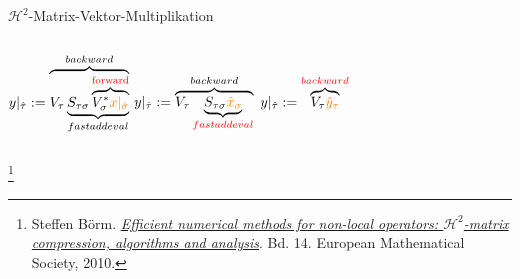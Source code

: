 \documentclass[10pt]{beamer}
\let\svthefootnote\thefootnote
\begin{document}
\begin{frame}{\(\mathcal{H}^2\)-Matrix-Vektor-Multiplikation}

  \begin{columns}
      \( y|_{\hat{\tau}} := \overbrace{V_{\tau} \underbrace{S_{\tau \sigma}
        \overbrace{V_{\sigma}^{*}
        \textcolor{orange}{x|_{\hat{\sigma}}}}^{\textcolor{red}{\text{forward}}}}_{fastaddeval}}^{backward} \)
      \( y|_{\hat{\tau}} := \overbrace{V_{\tau} \underbrace{S_{\tau \sigma}
         \textcolor{orange}{\hat{x}_\sigma}}_{\textcolor{red}{fastaddeval}}}^{backward} \)
      \( y|_{\hat{\tau}} := \overbrace{V_{\tau}
         \textcolor{orange}{\hat{y}_\tau}}^{\textcolor{red}{backward}} \)
  \end{columns}
  \footnotesize
  \let\thefootnote\relax\footnote{Steffen B{\"o}rm.
  \href{https://books.google.de/books/about/Efficient_Numerical_Methods_for_Non_loca.html?id=awMabNC9DTkC&redir_esc=y}
  {\textit{Efficient numerical methods for non-local operators: \(
   \mathcal{H}^{2} \)-matrix compression, algorithms and analysis}}. Bd. 14.  
   European Mathematical Society, 2010.}
  \addtocounter{footnote}{-1}\let\thefootnote\svthefootnote\relax
  \normalsize
\end{frame}
\end{document}
